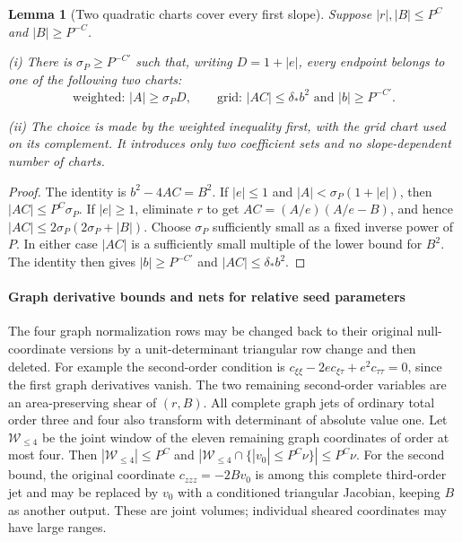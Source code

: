 \documentclass[11pt]{amsart}
\newtheorem{lemma}[theorem]{Lemma}
\theoremstyle{definition}
\theoremstyle{remark}
\numberwithin{equation}{section}
\begin{document}
\begin{lemma}[Two quadratic charts cover every first slope]\label{low:6:so36:two-charts}
Suppose $|r|,|B|\le P^C$ and $|B|\ge P^{-C}$.

\noindent\textup{(i)} There is $\sigma_P\ge P^{-C'}$ such that, writing $D=1+|e|$, every endpoint belongs to one of the following two charts:
\[
\text{weighted: }|A|\ge\sigma_PD,\qquad
\text{grid: }|AC|\le\delta_*b^2\text{ and }|b|\ge P^{-C'}.
\]

\noindent\textup{(ii)} The choice is made by the weighted inequality first, with the grid chart used on its complement. It introduces only two coefficient sets and no slope-dependent number of charts.
\end{lemma}
\begin{proof}
The identity is $b^2-4AC=B^2$. If $|e|\le1$ and $|A|<\sigma_P(1+|e|)$, then $|AC|\le P^C\sigma_P$. If $|e|\ge1$, eliminate $r$ to get $AC=(A/e)(A/e-B)$, and hence $|AC|\le2\sigma_P(2\sigma_P+|B|)$. Choose $\sigma_P$ sufficiently small as a fixed inverse power of $P$. In either case $|AC|$ is a sufficiently small multiple of the lower bound for $B^2$. The identity then gives $|b|\ge P^{-C'}$ and $|AC|\le\delta_*b^2$.
\end{proof}

\paragraph{Graph derivative bounds and nets for relative seed parameters}

The four graph normalization rows may be changed back to their original null-coordinate versions by a unit-determinant triangular row change and then deleted. For example the second-order condition is $c_{\xi\xi}-2e c_{\xi\tau}+e^2c_{\tau\tau}=0$, since the first graph derivatives vanish. The two remaining second-order variables are an area-preserving shear of $(r,B)$. All complete graph jets of ordinary total order three and four also transform with determinant of absolute value one. Let $\mathcal W_{\le4}$ be the joint window of the eleven remaining graph coordinates of order at most four. Then $|\mathcal W_{\le4}|\le P^C$ and $|\mathcal W_{\le4}\cap\{|v_0|\le P^C\nu\}|\le P^C\nu$. For the second bound, the original coordinate $c_{zzz}=-2Bv_0$ is among this complete third-order jet and may be replaced by $v_0$ with a conditioned triangular Jacobian, keeping $B$ as another output. These are joint volumes; individual sheared coordinates may have large ranges.
\end{document}

